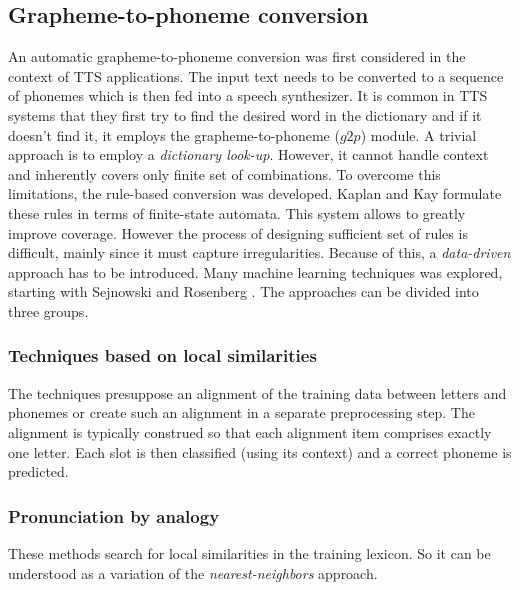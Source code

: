 \subsection{Grapheme-to-phoneme conversion}
An automatic grapheme-to-phoneme conversion was first considered in the context of TTS applications. The input text needs to be converted to a sequence of phonemes which is then fed into a speech synthesizer.
It is common in TTS systems that they first try to find the desired word in the dictionary and if it doesn't find it, it employs the grapheme-to-phoneme ($g2p$) module.
A trivial approach is to employ a \textit{dictionary look-up}.
However, it cannot handle context and inherently covers only finite set of combinations.
To overcome this limitations, the rule-based conversion was developed. Kaplan and Kay \cite{kaplan1994regular} formulate these rules in terms of finite-state automata.
This system allows to greatly improve coverage.
However the process of designing sufficient set of rules is difficult, mainly since it must capture irregularities.
Because of this, a \textit{data-driven} approach has to be introduced.
Many machine learning techniques was explored, starting with Sejnowski and Rosenberg \cite{sejnowski1988nettalk}.
The approaches can be divided into three groups.
\subsubsection{Techniques based on local similarities}
The techniques presuppose an alignment of the training data
between letters and phonemes or create such an alignment in a separate preprocessing
step.
The alignment is typically construed so that each alignment
item comprises exactly one letter. Each slot is then classified (using its context) and a correct phoneme is predicted.
\subsubsection{Pronunciation by analogy}
These methods search for local similarities in the training lexicon.
So it can be understood as a variation of the \textit{nearest-neighbors} approach.
